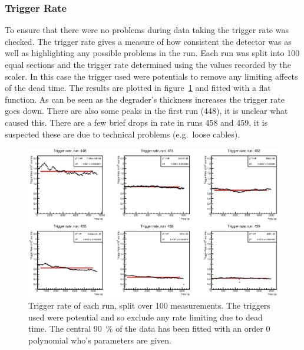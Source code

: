 \subsubsection{Trigger Rate} %
\label{sub:gain_stability}
To ensure that there were no problems during data taking the trigger rate was checked. The trigger rate gives a measure of how consistent the detector was as well as highlighting any possible problems in the run. Each run was split into 100 equal sections and the trigger rate determined using the values recorded by the scaler. In this case the trigger used were potentials to remove any limiting affects of the dead time. The results are plotted in figure~\ref{fig:gain_stability} and fitted with a flat function. As can be seen as the degrader's thickness increases the trigger rate goes down. There are also some peaks in the first run (448), it is unclear what caused this. There are a few brief drops in rate in runs 458 and 459, it is suspected these are due to technical problems (e.g.\ loose cables).
%
\begin{figure}
      \centering
          \includegraphics[width=\textwidth]{images/momentum_spectrum/gain_stability.eps}
      \caption{Trigger rate of each run, split over 100 measurements. The triggers used were potential and so exclude any rate limiting due to dead time. The central 90~\% of the data has been fitted with an order 0 polynomial who's parameters are given.}
      \label{fig:gain_stability}
\end{figure}

